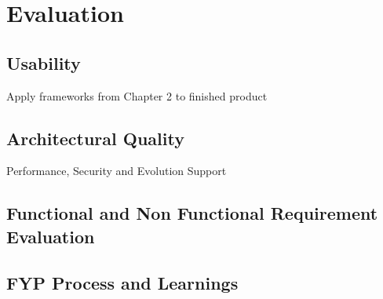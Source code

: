 \chapter{Evaluation}
\label{evaluation}

\section{Usability}

Apply frameworks from Chapter 2 to finished product

\section{Architectural Quality}

Performance, Security and Evolution Support

\section{Functional and Non Functional Requirement Evaluation}

\section{FYP Process and Learnings}